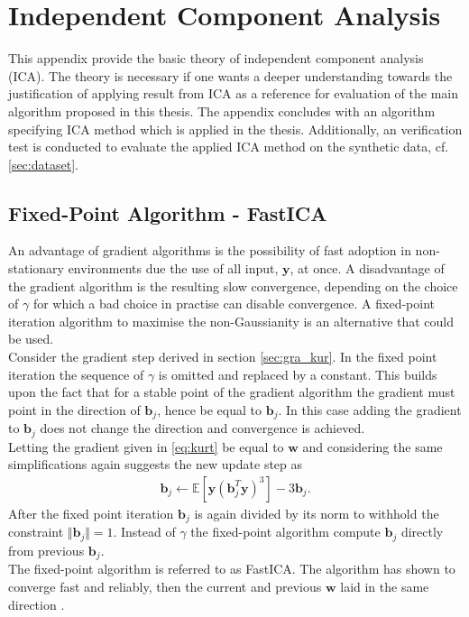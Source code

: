 \chapter{Independent Component Analysis}\label{app:ICA}
This appendix provide the basic theory of independent component analysis (ICA). The theory is necessary if one wants a deeper understanding towards the justification of applying result from ICA as a reference for evaluation of the main algorithm proposed in this thesis.   
The appendix concludes with an algorithm specifying ICA method which is applied in the thesis. Additionally, an verification test is conducted to evaluate the applied ICA method on the synthetic data, cf. \ref{sec:dataset}.   
 

\section{Fixed-Point Algorithm - FastICA}
An advantage of gradient algorithms is the possibility of fast adoption in non-stationary environments due the use of all input, $\textbf{y}$, at once. A disadvantage of the gradient algorithm is the resulting slow convergence, depending on the choice of $\gamma$ for which a bad choice in practise can disable convergence. A fixed-point iteration algorithm to maximise the non-Gaussianity is an alternative that could be used.\\
Consider the gradient step derived in section \ref{sec:gra_kur}.
In the fixed point iteration the sequence of $\gamma$ is omitted and replaced by a constant. This builds upon the fact that for a stable point of the gradient algorithm the gradient must point in the direction of $\textbf{b}_j$, hence be equal to $\textbf{b}_j$. In this case adding the gradient to $\textbf{b}_j$ does not change the direction and convergence is achieved.\\    
Letting the gradient given in \eqref{eq:kurt} be equal to $\mathbf{w}$ and  considering the same simplifications again
suggests the new update step as \cite[p. 179]{ICA}
\begin{align*}
\mathbf{b}_j \gets \mathbb{E}[\mathbf{y}(\textbf{b}_{j}^T \textbf{y})^3] - 3 \mathbf{b}_j.
\end{align*}
After the fixed point iteration $\textbf{b}_j$ is again divided by its norm to withhold the constraint $\Vert \textbf{b}_j \Vert = 1$.   
Instead of $\gamma$ the fixed-point algorithm compute $\mathbf{b}_j$ directly from previous $\mathbf{b}_j$.\\
The fixed-point algorithm is referred to as FastICA. The algorithm has shown to converge fast and reliably, then the current and previous $\mathbf{w}$ laid in the same direction \cite[p. 179]{ICA}. 

